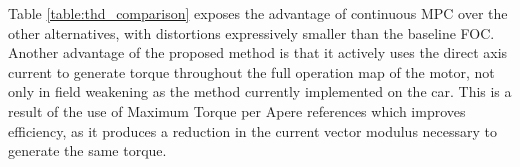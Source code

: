 \documentclass[9pt,conference]{IEEEtran}
\begin{document}
\begin{table}[h]
	\caption{Control Method Current THD comparison. THD is calculated until the Nyquist frequency, that is $250kHz$ and $40kHz$ for the controllers running at $50kHz$ and $8kHz$ respectively.}
	\label{table:thd_comparison}%
	\renewcommand{\arraystretch}{1.2} %
		\centering
\end{table}

Table \ref{table:thd_comparison} exposes the advantage of continuous MPC over the other alternatives, with distortions expressively smaller than the baseline FOC. Another advantage of the proposed method is that it actively uses the direct axis current to generate torque throughout the full operation map of the motor,  not only in field weakening as the method currently implemented on the car. This is a result of the use of Maximum Torque per Apere references which improves efficiency, as it produces a reduction in the current vector modulus necessary to generate the same torque.
\end{document}

